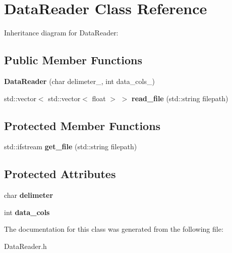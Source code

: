 \hypertarget{classDataReader}{}\section{Data\+Reader Class Reference}
\label{classDataReader}


Inheritance diagram for Data\+Reader\+:
\subsection*{Public Member Functions}
\begin{DoxyCompactItemize}
\item 
\mbox{\label{classDataReader_a64029958665c3e72624d2c90439d297b}} 
{\bfseries Data\+Reader} (char delimeter\+\_\+, int data\+\_\+cols\+\_\+)
\item 
\mbox{\label{classDataReader_aa319d0b428916f90ab04264db7228085}} 
std\+::vector$<$ std\+::vector$<$ float $>$ $>$ {\bfseries read\+\_\+file} (std\+::string filepath)
\end{DoxyCompactItemize}
\subsection*{Protected Member Functions}
\begin{DoxyCompactItemize}
\item 
\mbox{\label{classDataReader_a0e9af765fe3e2ed0f721b626fcf4d1d7}} 
std\+::ifstream {\bfseries get\+\_\+file} (std\+::string filepath)
\end{DoxyCompactItemize}
\subsection*{Protected Attributes}
\begin{DoxyCompactItemize}
\item 
\mbox{\label{classDataReader_a1d06e1b647a16667a9f9e4f88b06316c}} 
char {\bfseries delimeter}
\item 
\mbox{\label{classDataReader_abf88eedea2e0ef00584db595e1ced71a}} 
int {\bfseries data\+\_\+cols}
\end{DoxyCompactItemize}


The documentation for this class was generated from the following file\+:\begin{DoxyCompactItemize}
\item 
Data\+Reader.\+h\end{DoxyCompactItemize}
